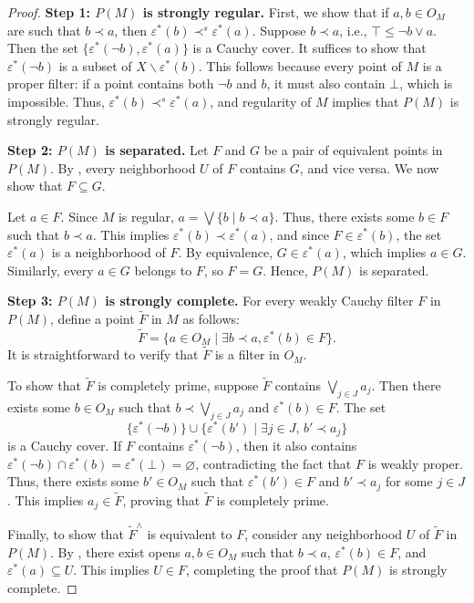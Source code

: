 \documentclass[pdflatex,sn-mathphys-num]{sn-jnl}
\theoremstyle{definition}
\theoremstyle{remark}
\numberwithin{figure}{section}
\newcommand{\rb}{\prec}
\begin{document}
\begin{proof}
\textbf{Step 1: $P(M)$ is strongly regular.}
First, we show that if $a,b \in O_M$ are such that $b \rb a$, then $\varepsilon^*(b) \rb^s \varepsilon^*(a)$.
Suppose $b \rb a$, i.e., $\top \leq \neg b \vee a$.
Then the set $\{ \varepsilon^*(\neg b), \varepsilon^*(a) \}$ is a Cauchy cover.
It suffices to show that $\varepsilon^*(\neg b)$ is a subset of $X \backslash \varepsilon^*(b)$.
This follows because every point of $M$ is a proper filter: if a point contains both $\neg b$ and $b$, it must also contain $\bot$, which is impossible.
Thus, $\varepsilon^*(b) \rb^s \varepsilon^*(a)$, and regularity of $M$ implies that $P(M)$ is strongly regular.

\textbf{Step 2: $P(M)$ is separated.}
Let $F$ and $G$ be a pair of equivalent points in $P(M)$.
By , every neighborhood $U$ of $F$ contains $G$, and vice versa.
We now show that $F \subseteq G$.

Let $a \in F$.
Since $M$ is regular, $a = \bigvee \{ b \mid b \rb a \}$.
Thus, there exists some $b \in F$ such that $b \rb a$.
This implies $\varepsilon^*(b) \rb \varepsilon^*(a)$, and since $F \in \varepsilon^*(b)$, the set $\varepsilon^*(a)$ is a neighborhood of $F$.
By equivalence, $G \in \varepsilon^*(a)$, which implies $a \in G$.
Similarly, every $a \in G$ belongs to $F$, so $F = G$.
Hence, $P(M)$ is separated.

\textbf{Step 3: $P(M)$ is strongly complete.}
For every weakly Cauchy filter $F$ in $P(M)$, define a point $\widetilde{F}$ in $M$ as follows:
\[
\widetilde{F} = \{ a \in O_M \mid \exists b \rb a, \varepsilon^*(b) \in F \}.
\]
It is straightforward to verify that $\widetilde{F}$ is a filter in $O_M$.

To show that $\widetilde{F}$ is completely prime, suppose $\widetilde{F}$ contains $\bigvee_{j \in J} a_j$.
Then there exists some $b \in O_M$ such that $b \rb \bigvee_{j \in J} a_j$ and $\varepsilon^*(b) \in F$.
The set 
\[
\{ \varepsilon^*(\neg b) \} \cup \{ \varepsilon^*(b') \mid \exists j \in J, \, b' \rb a_j \}
\]
is a Cauchy cover.
If $F$ contains $\varepsilon^*(\neg b)$, then it also contains
$\varepsilon^*(\neg b) \cap \varepsilon^*(b) = \varepsilon^*(\bot) = \varnothing$,
contradicting the fact that $F$ is weakly proper.
Thus, there exists some $b' \in O_M$ such that $\varepsilon^*(b') \in F$ and $b' \rb a_j$ for some $j \in J$.
This implies $a_j \in \widetilde{F}$, proving that $\widetilde{F}$ is completely prime.

Finally, to show that $\widetilde{F}^\wedge$ is equivalent to $F$, consider any neighborhood $U$ of $\widetilde{F}$ in $P(M)$.
By , there exist opens $a,b \in O_M$ such that $b \rb a$, $\varepsilon^*(b) \in F$, and $\varepsilon^*(a) \subseteq U$.
This implies $U \in F$, completing the proof that $P(M)$ is strongly complete.
\end{proof}
\end{document}
